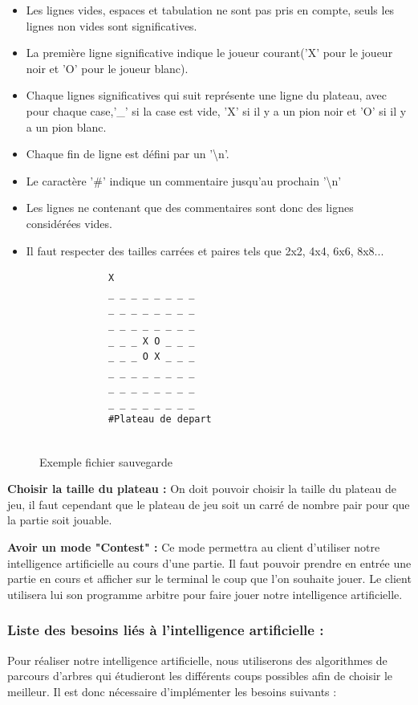 \documentclass[12pt]{article}
\begin{document}
\begin{itemize}
\item Les lignes vides, espaces et tabulation ne sont pas pris en compte, seuls les lignes non vides sont significatives.
\item La première ligne significative indique le joueur courant('X' pour le joueur noir et 'O' pour le joueur blanc).
\item Chaque lignes significatives qui suit représente une ligne du plateau, avec pour chaque case,'\_' si la case est vide, 'X' si il y a un pion noir et 'O' si il y a un pion blanc.
\item Chaque fin de ligne est défini par un '\textbackslash n'.
\item Le caractère '\#' indique un commentaire jusqu'au prochain '\textbackslash n'
\item Les lignes ne contenant que des commentaires sont donc des lignes considérées vides.
\item Il faut respecter des tailles carrées et paires tels que 2x2, 4x4, 6x6, 8x8...
\end{itemize}
\begin{figure}[H]

\begin{lstlisting}
		    X
		    _ _ _ _ _ _ _ _
		    _ _ _ _ _ _ _ _
		    _ _ _ _ _ _ _ _
		    _ _ _ X O _ _ _
		    _ _ _ O X _ _ _
		    _ _ _ _ _ _ _ _
		    _ _ _ _ _ _ _ _
		    _ _ _ _ _ _ _ _
		    #Plateau de depart
             
\end{lstlisting}
\caption[SaveExemple]
{Exemple fichier sauvegarde}
\label{SaveExemple}

\end{figure}

\textbf{Choisir la taille du plateau :}
On doit pouvoir choisir la taille du plateau de jeu, il faut cependant que  le plateau de jeu soit un carré de nombre pair pour que la partie soit jouable.

\textbf{Avoir un mode "Contest" :} 
Ce mode permettra au client d'utiliser notre intelligence artificielle au cours d'une partie. Il faut pouvoir prendre en entrée une partie en cours et afficher sur le terminal le coup que l'on souhaite jouer. Le client utilisera lui son programme arbitre pour faire jouer notre intelligence artificielle.


\subsubsection{Liste des besoins liés à l'intelligence artificielle :}
Pour réaliser notre intelligence artificielle, nous utiliserons des algorithmes de parcours d'arbres\cite{arbre} qui étudieront les différents coups possibles afin de choisir le meilleur. Il est donc nécessaire d'implémenter les besoins suivants :
\end{document}
